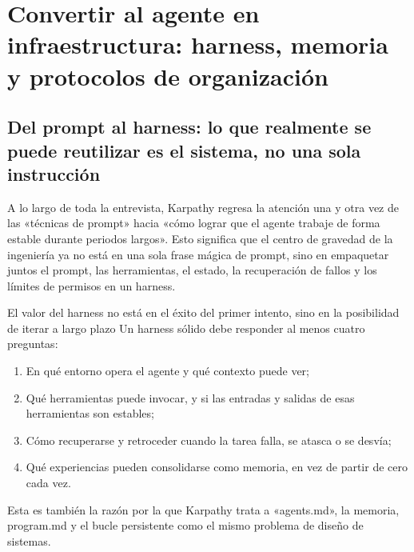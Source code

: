 \section{Convertir al agente en infraestructura: harness, memoria y protocolos de organización}

\subsection{Del prompt al harness: lo que realmente se puede reutilizar es el sistema, no una sola instrucción}
A lo largo de toda la entrevista, Karpathy regresa la atención una y otra vez de las «técnicas de prompt» hacia «cómo lograr que el agente trabaje de forma estable durante periodos largos». Esto significa que el centro de gravedad de la ingeniería ya no está en una sola frase mágica de prompt, sino en empaquetar juntos el prompt, las herramientas, el estado, la recuperación de fallos y los límites de permisos en un harness.

\begin{importantbox}{El valor del harness no está en el éxito del primer intento, sino en la posibilidad de iterar a largo plazo}
Un harness sólido debe responder al menos cuatro preguntas:
\begin{enumerate}
    \item En qué entorno opera el agente y qué contexto puede ver;
    \item Qué herramientas puede invocar, y si las entradas y salidas de esas herramientas son estables;
    \item Cómo recuperarse y retroceder cuando la tarea falla, se atasca o se desvía;
    \item Qué experiencias pueden consolidarse como memoria, en vez de partir de cero cada vez.
\end{enumerate}
Esta es también la razón por la que Karpathy trata a «agents.md», la memoria, program.md y el bucle persistente como el mismo problema de diseño de sistemas.
\end{importantbox}

